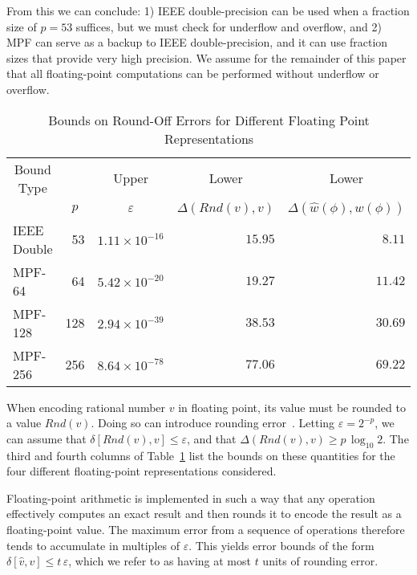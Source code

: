 \documentclass[
hf
]{ceurart}
\newcommand{\approximate}[1]{\hat{#1}}
\newcommand{\approxv}{\approximate{v}}
\newcommand{\approxw}{\approximate{w}}
\newcommand{\round}{\mathit{Rnd}}
\newcommand{\aerror}{\delta}
\newcommand{\digitprecision}{\Delta}
\newcommand{\roundepsilon}{\varepsilon}
\begin{document}
From this we can conclude: 1) IEEE double-precision can be used when a
fraction size of $p=53$ suffices, but we must check for underflow and
overflow, and 2) MPF can serve as a backup to IEEE double-precision,
and it can use fraction sizes that provide very high precision.  We
assume for the remainder of this paper that all floating-point
computations can be performed without underflow or overflow.

\begin{table}
  \caption{Bounds on Round-Off Errors for Different Floating Point Representations}
  \label{tab:precision}
  \begin{center}
  \begin{tabular}{lrrrr}
    \toprule
    \multicolumn{1}{c}{Bound Type} & & \multicolumn{1}{c}{Upper} & \multicolumn{1}{c}{Lower} & \multicolumn{1}{c}{Lower} \\
    \multicolumn{1}{c}{} & \multicolumn{1}{c}{$p$} & \multicolumn{1}{c}{$\roundepsilon$} & \multicolumn{1}{c}{$\digitprecision(\round(v), v)$} & \multicolumn{1}{c}{$\digitprecision(\approxw(\phi), w(\phi))$} \\
    \midrule
    IEEE Double &  53 & $1.11 \times 10^{-16}$ & $15.95$    & $8.11$ \\
    MPF-64      &  64 & $5.42 \times 10^{-20}$   & $19.27$  & $11.42$ \\
    MPF-128      &  128 & $2.94 \times 10^{-39}$ &  $38.53$ & $30.69$  \\
    MPF-256      &  256 & $8.64 \times 10^{-78}$ & $77.06$ & $69.22$ \\
    \bottomrule
  \end{tabular}
  \end{center}
\end{table}

When encoding rational number $v$ in floating point, its value must be
rounded to a value $\round(v)$.  Doing so can introduce rounding
error~\cite{knuth:fp:1981,muller:hfpa:2018}.  Letting $\roundepsilon =
2^{-p}$, we can assume that $\aerror[\round(v), v] \leq
\roundepsilon$, and that $\digitprecision(\round(v), v) \geq p \,
\log_{10} 2$.  The third and fourth columns of
Table~\ref{tab:precision} list the bounds on these quantities for the
four different floating-point representations considered.

Floating-point arithmetic is implemented in such a way that any
operation effectively computes an exact result and then rounds it to
encode the result as a floating-point value.  The maximum error from a sequence of operations
therefore tends to accumulate in multiples of $\roundepsilon$.
This yields error bounds of the form $\aerror[\approxv, v] \leq t\,\roundepsilon$,
which we  refer to as having at most $t$ units of
rounding error.
\end{document}
